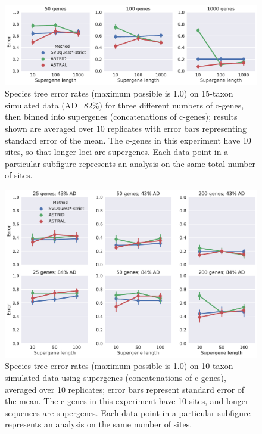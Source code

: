 \begin{figure}
  \centering
  \includegraphics[width=\textwidth]{svdquest-figs/binned_rfdists_nocaml_15tax.pdf}
  \caption[Species tree topological error rates for 15-taxon simulated data with supergenes]{Species tree error rates (maximum possible is 1.0) on 15-taxon simulated data (AD=82\%) for three different numbers of c-genes, then binned into 
    supergenes (concatenations of c-genes); results shown are averaged over 10 replicates with error bars
    representing standard error of the mean.
    The c-genes in this experiment
    have 10 sites, so that longer loci are supergenes.  Each data point in a particular
    subfigure represents an analysis on the same total number of sites. 
    }\label{svdquest::binned_15}
\end{figure}



\begin{figure}
  \centering
  \includegraphics[width=\textwidth]{svdquest-figs/binned_rfdists_nocaml_10tax.pdf}
  \caption[Species tree topological error rates for 10-taxon simulated data with supergenes]{Species tree error rates (maximum possible is 1.0) on 10-taxon simulated data using
    supergenes (concatenations of c-genes), averaged over 10 replicates; error bars
    represent standard error of the mean. The c-genes in this experiment
    have 10 sites, and longer sequences are supergenes.
    Each data point in a particular subfigure
    represents an analysis on the same number of sites. 
    }\label{svdquest::binned_10}
\end{figure}


